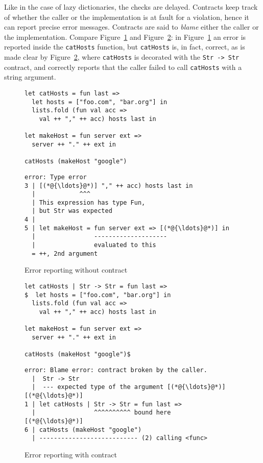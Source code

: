 \documentclass[sigplan,10pt]{acmart}
\newcommand{\nickel}[1]{\lstinline[language=nickel]{#1}}
\begin{document}
Like in the case of lazy dictionaries, the checks are delayed.
Contracts keep track of whether the caller or the implementation is
at fault for a violation, hence it can report precise error
messages. Contracts are said to \emph{blame} either the caller or the
implementation. Compare Figure~\ref{fig:contract-reporting-wo} and
Figure~\ref{fig:contract-reporting-w}: in
Figure~\ref{fig:contract-reporting-wo} an error is reported inside the
\nickel{catHosts} function, but \nickel{catHosts} is, in fact,
correct, as is made clear by Figure~\ref{fig:contract-reporting-w},
where \nickel{catHosts} is decorated with the \nickel{Str -> Str}
contract, and correctly reports that the caller failed to call
\nickel{catHosts} with a string argument.

\begin{figure*}
  \centering
  \begin{subfigure}[b]{0.48\linewidth}
    \begin{lstlisting}[language=nickel]
let catHosts = fun last =>
  let hosts = ["foo.com", "bar.org"] in
  lists.fold (fun val acc =>
    val ++ "," ++ acc) hosts last in

let makeHost = fun server ext =>
  server ++ "." ++ ext in

catHosts (makeHost "google")
\end{lstlisting}

    \begin{lstlisting}[frame=none,numbers=none, basicstyle=\footnotesize\ttfamily]
error: Type error
3 | [(*@{\ldots}@*)] "," ++ acc) hosts last in
  |            ^^^
  | This expression has type Fun,
  | but Str was expected
4 |
5 | let makeHost = fun server ext => [(*@{\ldots}@*)] in
  |                --------------------
  |                evaluated to this
  = ++, 2nd argument
\end{lstlisting}
    \caption{Error reporting without contract}
    \label{fig:contract-reporting-wo}
  \end{subfigure}
  \hfill
  \begin{subfigure}[b]{0.48\linewidth}
    \begin{lstlisting}[language=nickel]
let catHosts | Str -> Str = fun last =>
$  let hosts = ["foo.com", "bar.org"] in
  lists.fold (fun val acc =>
    val ++ "," ++ acc) hosts last in

let makeHost = fun server ext =>
  server ++ "." ++ ext in

catHosts (makeHost "google")$
\end{lstlisting}
    \begin{lstlisting}[frame=none,numbers=none, basicstyle=\footnotesize\ttfamily]
error: Blame error: contract broken by the caller.
  |  Str -> Str
  |  --- expected type of the argument [(*@{\ldots}@*)]
[(*@{\ldots}@*)]
1 | let catHosts | Str -> Str = fun last =>
  |                ^^^^^^^^^^ bound here
[(*@{\ldots}@*)]
6 | catHosts (makeHost "google")
  | --------------------------- (2) calling <func>
    \end{lstlisting}
    \caption{Error reporting with contract}
    \label{fig:contract-reporting-w}
  \end{subfigure}
  \caption{Contracts improve error messages}
\end{figure*}
\end{document}
